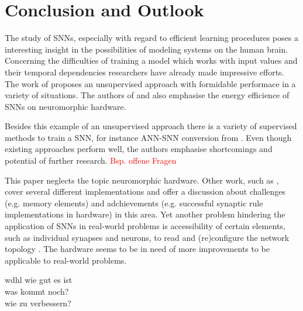 \section{Conclusion and Outlook}
\label{sec:conclusion}

The study of \acp{SNN}, especially with regard to efficient learning procedures poses a interesting insight in the possibilities of modeling
systems on the human brain.
Concerning the difficulties of training a model which works with input values and their temporal dependencies researchers have already made 
impressive efforts.
The work of \cite{SNN} proposes an unsupervised approach with formidable performace in a variety of situations.
The authors of \cite{SNN} and \cite{Synaptic_plasticity} also emphasise the energy efficience of \acp{SNN} on neuromorphic hardware.

Besides this example of an unsupervised approach there is a variety of supervised methods to train a \ac{SNN}, 
for instance \ac{ANN}-\ac{SNN} conversion from \cite{DIET_SNN}.
Even though existing approaches perform well, the authors emphasise shortcomings and potential of further research.
\textcolor{red}{Bsp. offene Fragen}

This paper neglects the topic neuromorphic hardware.
Other work, such as \cite{Synaptic_plasticity}, 
cover several different implementations and offer a discussion about challenges (e.g. memory elements) and adchievements 
(e.g. successful synaptic rule implementations in hardware) in this area.
Yet another problem hindering the application of \acp{SNN} in real-world problems is accessibility of certain elements, such as individual synapses and neurons, 
to read and (re)configure the network topology \cite{hardware_STDP}.
The hardware seems to be in need of more improvements to be applicable to real-world problems.

wdhl wie gut es ist\\
was kommt noch?\\
wie zu verbessern?